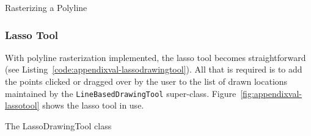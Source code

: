 \begin{stulisting}[p]
\caption{Rasterizing a Polyline}
\label{code:appendixval-rasterizepolyline}

\end{stulisting}

\subsubsection{Lasso Tool}


With polyline rasterization implemented, the lasso tool becomes straightforward (see Listing~\ref{code:appendixval-lassodrawingtool}). All that is required is to add the points clicked or dragged over by the user to the list of drawn locations maintained by the \texttt{LineBasedDrawingTool} super-class. Figure~\ref{fig:appendixval-lassotool} shows the lasso tool in use.

\begin{stulisting}[!h]
\caption{The LassoDrawingTool class}
\label{code:appendixval-lassodrawingtool}

\end{stulisting}

